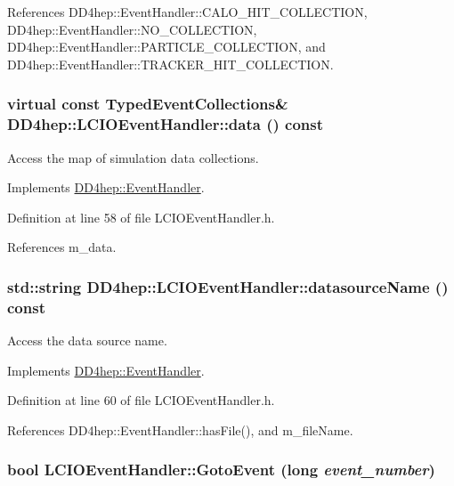 References DD4hep::EventHandler::CALO\_\-HIT\_\-COLLECTION, DD4hep::EventHandler::NO\_\-COLLECTION, DD4hep::EventHandler::PARTICLE\_\-COLLECTION, and DD4hep::EventHandler::TRACKER\_\-HIT\_\-COLLECTION.\hypertarget{class_d_d4hep_1_1_l_c_i_o_event_handler_a7118606d31e1a2a3b988af04a6dbcc2d}{
\subsubsection[{data}]{\setlength{\rightskip}{0pt plus 5cm}virtual const {\bf TypedEventCollections}\& DD4hep::LCIOEventHandler::data () const}}
\label{class_d_d4hep_1_1_l_c_i_o_event_handler_a7118606d31e1a2a3b988af04a6dbcc2d}


Access the map of simulation data collections. 

Implements \hyperlink{class_d_d4hep_1_1_event_handler_a263d136331d72994bcbf537d4aa16d4f}{DD4hep::EventHandler}.

Definition at line 58 of file LCIOEventHandler.h.

References m\_\-data.\hypertarget{class_d_d4hep_1_1_l_c_i_o_event_handler_a5be4ec13eea78675737c710f6505ac33}{
\subsubsection[{datasourceName}]{\setlength{\rightskip}{0pt plus 5cm}std::string DD4hep::LCIOEventHandler::datasourceName () const}}
\label{class_d_d4hep_1_1_l_c_i_o_event_handler_a5be4ec13eea78675737c710f6505ac33}


Access the data source name. 

Implements \hyperlink{class_d_d4hep_1_1_event_handler_a5fa231363a787ba7edf520b5a99f294e}{DD4hep::EventHandler}.

Definition at line 60 of file LCIOEventHandler.h.

References DD4hep::EventHandler::hasFile(), and m\_\-fileName.\hypertarget{class_d_d4hep_1_1_l_c_i_o_event_handler_af7089e4660ace0f0a4da544bb39660e5}{
\subsubsection[{GotoEvent}]{\setlength{\rightskip}{0pt plus 5cm}bool LCIOEventHandler::GotoEvent (long {\em event\_\-number})}}
\label{class_d_d4hep_1_1_l_c_i_o_event_handler_af7089e4660ace0f0a4da544bb39660e5}


